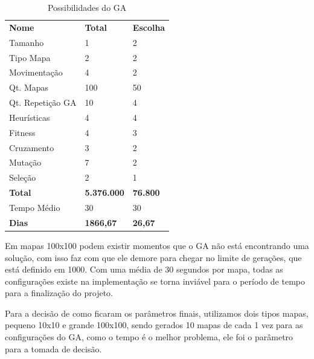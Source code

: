 \begin{table}[]
	\centering
	\caption{Possibilidades do GA}
	\label{my-label}
	\begin{tabular}{lll}
		\textbf{Nome} 				& \textbf{Total}     & \textbf{Escolha} \\
		Tamanho                     & 1                  & 2                \\
		Tipo Mapa                   & 2                  & 2                \\
		Movimentação                & 4                  & 2                \\
		Qt. Mapas                   & 100                & 50               \\
		Qt. Repetição GA            & 10                 & 4                \\
		Heurísticas                 & 4                  & 4                \\
		Fitness                     & 4                  & 3                \\
		Cruzamento                   & 3                  & 2                \\
		Mutação                     & 7                  & 2                \\
		Seleção                     & 2                  & 1                \\
		\textbf{Total}              & \textbf{5.376.000} & \textbf{76.800}  \\
		Tempo Médio                 & 30                 & 30               \\
		\textbf{Dias}               & \textbf{1866,67}   & \textbf{26,67}  
	\end{tabular}
\end{table}

Em mapas 100x100 podem existir momentos que o GA não está encontrando uma solução, com isso faz com que ele demore para chegar no limite de gerações, que está definido em 1000. Com uma média de 30 segundos por mapa, todas as configurações existe na implementação se torna inviável para o período de tempo para a finalização do projeto.

Para a decisão de como ficaram os parâmetros finais, utilizamos dois tipos mapas, pequeno 10x10 e grande 100x100, sendo gerados 10 mapas de cada 1 vez para as configurações do GA, como o tempo é o melhor problema, ele foi o parâmetro para a tomada de decisão.

